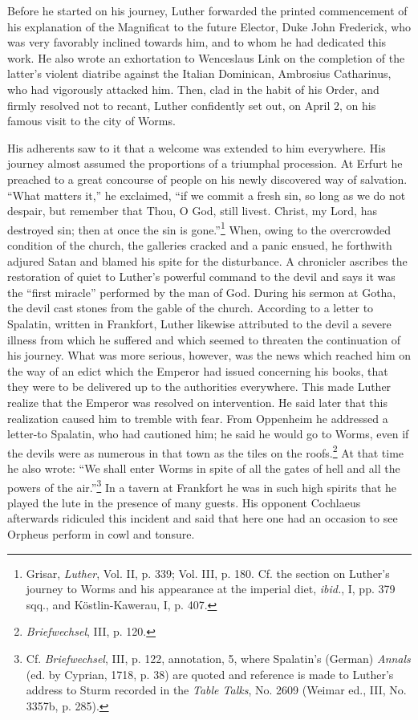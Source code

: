 Before he started on his journey, Luther forwarded the printed
commencement of his explanation of the Magnificat to the future
Elector, Duke John Frederick, who was very favorably inclined
towards him, and to whom
he had dedicated this work. He also wrote
an exhortation to Wenceslaus Link on the completion of the latter’s
violent diatribe against the Italian Dominican, Ambrosius Catharinus,
who had vigorously attacked him. Then, clad in the habit of his Order,
and firmly resolved not to recant, Luther confidently set out,
on April 2, on his famous visit to the city of Worms.

His adherents saw to it that a welcome was extended to him everywhere.
His journey almost assumed the proportions of a triumphal
procession. At Erfurt he preached to a great concourse of people on
his newly discovered way of salvation. “What matters it,” he exclaimed,
“if we commit a fresh sin, so long as we do not despair, but
remember that Thou, O God, still livest. Christ, my Lord, has destroyed
sin; then at once the sin is gone.”\footnote
{Grisar, \textit{Luther}, Vol. II, p. 339; Vol. III, p. 180. Cf. the section on
Luther’s journey to Worms and his appearance at the imperial diet,
\textit{ibid.}, I, pp. 379 sqq., and Köstlin-Kawerau, I, p. 407.}
When, owing to the overcrowded condition
of the church, the galleries cracked and a panic
ensued, he forthwith adjured Satan and blamed his spite for the disturbance.
A chronicler ascribes the restoration of quiet to Luther’s
powerful command to the devil and says it was the “first miracle”
performed by the man of God. During his sermon at Gotha, the
devil cast stones from the gable of the church. According to a letter
to Spalatin, written in Frankfort, Luther likewise attributed to the
devil a severe illness from which he suffered and which seemed to
threaten the continuation of his journey. What was more serious,
however, was the news which reached him on the way of an edict
which the Emperor had issued concerning his books, that they were to
be delivered up to the authorities everywhere. This made Luther realize
that the Emperor was resolved on intervention. He said later that
this realization caused him to tremble with fear. From Oppenheim
he addressed a letter-to Spalatin, who had cautioned him; he said he
would go to Worms, even if the devils were as numerous in that town
as the tiles on the roofs.\footnote{\textit{Briefwechsel}, III, p. 120.}
At that time he also wrote: “We shall enter
Worms in spite of all the gates of hell and all the powers of the
air.”\footnote
{Cf. \textit{Briefwechsel}, III, p. 122, annotation, 5, where Spalatin’s (German) \textit{Annals} (ed. by
Cyprian, 1718, p. 38) are quoted and reference is made to Luther’s address to Sturm recorded
in the \textit{Table Talks}, No. 2609 (Weimar ed., III, No. 3357b, p. 285).}
In a tavern at Frankfort he was in such high spirits that he
played the lute in the presence of many guests. His opponent Cochlaeus afterwards
ridiculed this incident and said that here one had an
occasion to see Orpheus perform in cowl and tonsure.

